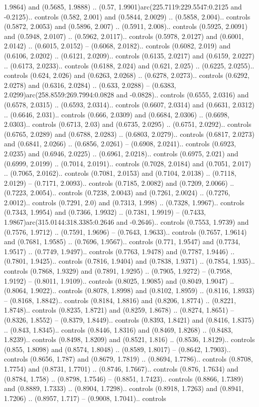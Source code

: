 1.9864) and (0.5685, 1.9888) .. (0.57, 1.9901)arc(225.7119:229.5547:0.2125 and -0.2125).. controls (0.582, 2.001) and (0.5844, 2.0029) .. (0.5858, 2.004).. controls (0.5872, 2.0053) and (0.5896, 2.007) .. (0.5911, 2.008).. controls (0.5925, 2.0091) and (0.5948, 2.0107) .. (0.5962, 2.0117).. controls (0.5978, 2.0127) and (0.6001, 2.0142) .. (0.6015, 2.0152) -- (0.6068, 2.0182).. controls (0.6082, 2.019) and (0.6106, 2.0202) .. (0.6121, 2.0209).. controls (0.6135, 2.0217) and (0.6159, 2.0227) .. (0.6173, 2.0233).. controls (0.6188, 2.024) and (0.621, 2.025) .. (0.6225, 2.0255).. controls (0.624, 2.026) and (0.6263, 2.0268) .. (0.6278, 2.0273).. controls (0.6292, 2.0278) and (0.6316, 2.0284) .. (0.633, 2.0288) -- (0.6383, 2.0299)arc(258.8559:269.7994:0.0828 and -0.0828).. controls (0.6555, 2.0316) and (0.6578, 2.0315) .. (0.6593, 2.0314).. controls (0.6607, 2.0314) and (0.6631, 2.0312) .. (0.6646, 2.031).. controls (0.666, 2.0309) and (0.6684, 2.0306) .. (0.6698, 2.0303).. controls (0.6713, 2.03) and (0.6735, 2.0295) .. (0.6751, 2.0292).. controls (0.6765, 2.0289) and (0.6788, 2.0283) .. (0.6803, 2.0279).. controls (0.6817, 2.0273) and (0.6841, 2.0266) .. (0.6856, 2.0261) -- (0.6908, 2.0241).. controls (0.6923, 2.0235) and (0.6946, 2.0225) .. (0.6961, 2.0218).. controls (0.6975, 2.021) and (0.6999, 2.0199) .. (0.7014, 2.0191).. controls (0.7028, 2.0184) and (0.7051, 2.017) .. (0.7065, 2.0162).. controls (0.7081, 2.0153) and (0.7104, 2.0138) .. (0.7118, 2.0129) -- (0.7171, 2.0093).. controls (0.7185, 2.0082) and (0.7209, 2.0066) .. (0.7223, 2.0054).. controls (0.7238, 2.0043) and (0.7261, 2.0024) .. (0.7276, 2.0012).. controls (0.7291, 2.0) and (0.7313, 1.998) .. (0.7328, 1.9967).. controls (0.7343, 1.9954) and (0.7366, 1.9932) .. (0.7381, 1.9919) -- (0.7433, 1.9867)arc(315.0144:318.3385:0.2646 and -0.2646).. controls (0.7553, 1.9739) and (0.7576, 1.9712) .. (0.7591, 1.9696) -- (0.7643, 1.9633).. controls (0.7657, 1.9614) and (0.7681, 1.9585) .. (0.7696, 1.9567).. controls (0.771, 1.9547) and (0.7734, 1.9517) .. (0.7749, 1.9497).. controls (0.7763, 1.9478) and (0.7787, 1.9446) .. (0.7801, 1.9425).. controls (0.7816, 1.9404) and (0.7838, 1.9371) .. (0.7854, 1.935).. controls (0.7868, 1.9329) and (0.7891, 1.9295) .. (0.7905, 1.9272) -- (0.7958, 1.9192) -- (0.8011, 1.9109).. controls (0.8025, 1.9085) and (0.8049, 1.9047) .. (0.8064, 1.9022).. controls (0.8078, 1.8998) and (0.8102, 1.8959) .. (0.8116, 1.8933) -- (0.8168, 1.8842).. controls (0.8184, 1.8816) and (0.8206, 1.8774) .. (0.8221, 1.8748).. controls (0.8235, 1.8721) and (0.8259, 1.8678) .. (0.8274, 1.8651) -- (0.8326, 1.8552) -- (0.8379, 1.8449).. controls (0.8393, 1.8421) and (0.8416, 1.8375) .. (0.843, 1.8345).. controls (0.8446, 1.8316) and (0.8469, 1.8268) .. (0.8483, 1.8239).. controls (0.8498, 1.8209) and (0.8521, 1.816) .. (0.8536, 1.8129).. controls (0.855, 1.8098) and (0.8574, 1.8048) .. (0.8589, 1.8017) -- (0.8642, 1.7903).. controls (0.8656, 1.787) and (0.8679, 1.7819) .. (0.8694, 1.7786).. controls (0.8708, 1.7754) and (0.8731, 1.7701) .. (0.8746, 1.7667).. controls (0.876, 1.7634) and (0.8784, 1.758) .. (0.8798, 1.7546) -- (0.8851, 1.7423).. controls (0.8866, 1.7389) and (0.8889, 1.7333) .. (0.8904, 1.7298).. controls (0.8918, 1.7263) and (0.8941, 1.7206) .. (0.8957, 1.717) -- (0.9008, 1.7041).. controls 